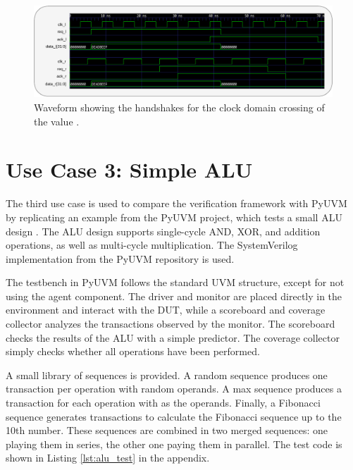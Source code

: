 \begin{figure}[t]
  \centering
  \includegraphics[width=\textwidth]{diagrams/cdc_timing.pdf}
  \caption{Waveform showing the handshakes for the clock domain crossing of the value .}
  \label{fig:cdc_timing}
\end{figure}

\section{Use Case 3: Simple ALU} %

The third use case is used to compare the verification framework with PyUVM by replicating an example from the PyUVM
project, which tests a small ALU design \cite{pyuvm_tinyalu}. The ALU design supports single-cycle AND, XOR, and
addition operations, as well as multi-cycle multiplication. The SystemVerilog implementation from the PyUVM repository is used.

The testbench in PyUVM follows the standard UVM structure, except for not using the agent component. The driver and
monitor are placed directly in the environment and interact with the DUT, while a scoreboard and coverage collector
analyzes the transactions observed by the monitor. The scoreboard checks the results of the ALU with a simple
predictor. The coverage collector simply checks whether all operations have been performed.

A small library of sequences is provided. A random sequence produces one transaction per operation with random
operands. A max sequence produces a transaction for each operation with  as the operands. Finally, a
Fibonacci sequence generates transactions to calculate the Fibonacci sequence up to the 10th number. These sequences
are combined in two merged sequences: one playing them in series, the other one paying them in parallel. The test code is shown in Listing \ref{lst:alu_test} in the appendix.

